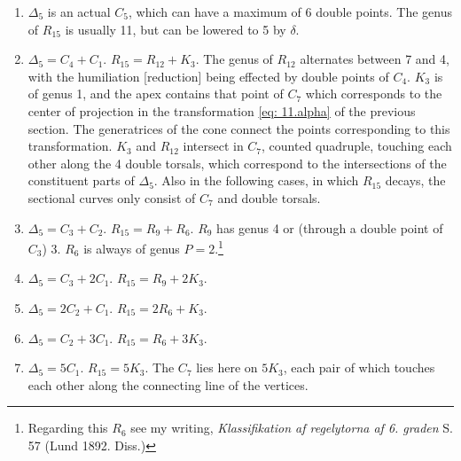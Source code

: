 \documentclass[leqno]{article}
\begin{document}
\begin{enumerate}[label=\arabic*)]
	\item $\Delta_5$ is an actual $C_5$, which can have a maximum of 6 double points. The genus of $R_{15}$ is usually 11, but can be lowered to 5 by $\delta$.
	\item $\Delta_5 = C_4 + C_1$. $R_{15} = R_{12} + K_3$. The genus of $R_{12}$ alternates between 7 and 4, with the humiliation [reduction] being effected by  double points of $C_4$. $K_3$ is of genus 1, and the apex contains that point of $C_7$ which corresponds to the center of projection in the transformation \eqref{eq: 11.alpha} of the previous section. The generatrices of the cone connect the points corresponding to this transformation. $K_3$ and $R_{12}$ intersect in $C_7$, counted quadruple, touching each other along the 4 double torsals, which correspond to the intersections of the constituent parts of $\Delta_5$. Also in the following cases, in which $R_{15}$ decays, the sectional curves only consist of $C_7$ and double torsals.
	\item $\Delta_5 = C_3 + C_2$. $R_{15} = R_9 + R_6$. $R_9$ has genus 4 or (through a double point of $C_3$) 3. $R_6$ is always of genus $P=2$.\footnote{Regarding this $R_6$ see my writing, \textit{Klassifikation af regelytorna af 6. graden} S. 57 (Lund 1892. Diss.)} 
	\item $\Delta_5 = C_3 + 2 C_1$. $R_{15} = R_9 + 2 K_3$. 
	\item $\Delta_5 = 2 C_2 + C_1$. $R_{15} = 2 R_6 + K_3$.
	\item $\Delta_5 = C_2 + 3 C_1$. $R_{15} = R_6 + 3 K_3$.
	\item $\Delta_5 = 5 C_1$. $R_{15} = 5 K_3$. The $C_7$ lies here on $5K_3$, each pair of which touches each other along the connecting line of the vertices.
\end{enumerate}
\end{document}
